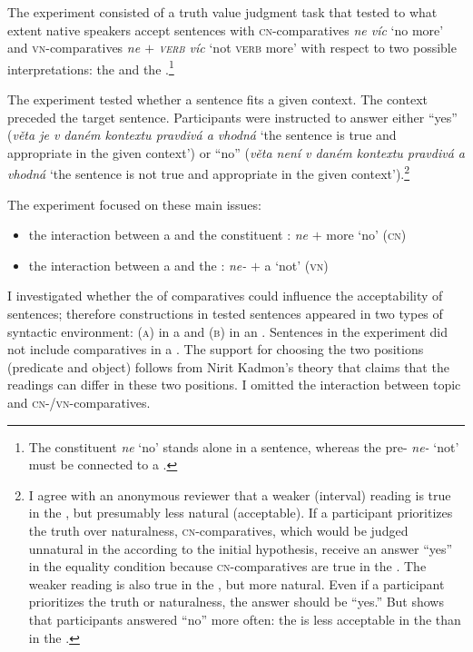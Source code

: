 \documentclass[output=paper, colorlinks, citecolor=brown, newtxmath]{langsci/langscibook}
\begin{document}
The experiment consisted of a truth value judgment task that tested to what extent  native speakers accept sentences with \textsc{cn-}comparatives \textit{ne víc} `no more' and \textsc{vn-}comparatives \textit{ne $+$ \textsc{verb} víc} `not \textsc{verb} more' with respect to two possible interpretations: the  and the .\footnote{The constituent  \textit{ne} `no' stands alone in a sentence, whereas the pre- \textit{ne-} `not' must be connected to a .}

The experiment tested whether a sentence fits a given context. The context preceded the target sentence. Participants were instructed to answer either ``yes'' (\textit{věta je v daném kontextu pravdivá a vhodná} `the sentence is true and appropriate in the given context') or ``no'' (\textit{věta není v daném kontextu pravdivá a vhodná} `the sentence is not true and appropriate in the given context').\footnote{I agree with an anonymous reviewer that a weaker (interval) reading is true in the , but presumably less natural (acceptable). If a participant prioritizes the truth over naturalness, \textsc{cn}-comparatives, which would be judged unnatural in the  according to the initial hypothesis, receive an answer ``yes'' in the equality condition because  \textsc{cn-}comparatives are true in the . The weaker reading is also true in the , but more natural. Even if a participant prioritizes the truth or naturalness, the answer should be ``yes.'' But  shows that participants answered ``no'' more often: the  is less acceptable in the  than in the .}

The experiment focused on these main issues:

\begin{itemize}
\item the interaction between a  and the constituent : \textit{ne} $+$ more `no' (\textsc{cn})
\item the interaction between a  and the : \textit{ne-} $+$ a  `not' (\textsc{vn})
\end{itemize}

\noindent I investigated whether the  of comparatives could influence the acceptability of sentences; therefore  constructions in tested sentences appeared in two types of syntactic environment: (\textsc{a}) in a  and (\textsc{b}) in an . Sentences in the experiment did not include comparatives in a . The support for choosing the two positions (predicate and object) follows from Nirit Kadmon's theory \citep{kadmon2001formal} that claims that the readings can differ in these two positions. I omitted the interaction between topic and \textsc{cn-/vn-}comparatives.
\end{document}

